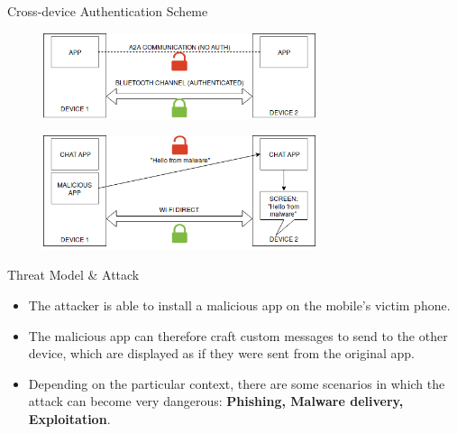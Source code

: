 \documentclass[10pt]{beamer}
\begin{document}
 
\begin{frame}[fragile]{Cross-device Authentication Scheme}



   
  \begin{figure}[bhp]
    \centering
	\includegraphics[width=80mm]{img/2-background}
     \end{figure}

     \begin{figure}[bhp]
    \centering
	\includegraphics[width=80mm]{img/2-malware}
     \end{figure}
  
 
  
\end{frame}

\begin{frame}[fragile]{Threat Model \& Attack}

  \begin{itemize}


  \item The attacker is able to install a malicious app on the
    mobile's victim phone.

  \item The malicious app can therefore craft custom messages to send
    to the other device, which are displayed as if they were sent from
    the original app.

  \item Depending on the particular context, there are some scenarios
    in which the attack can become very dangerous: {\bf Phishing,
      Malware delivery, Exploitation}.

  \end{itemize}

  
\end{frame}
\end{document}

